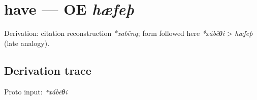 \documentclass[
  british,
  a4paper,
  openany]{book}
\providecommand{\texorpdfstring}[2]{#1}
\begin{document}
\section{\texorpdfstring{have --- OE
\emph{hæfeþ}}{have --- OE hæfeþ}}\label{have-oe-huxe6feuxfe}


Derivation: citation reconstruction \emph{*xabēną}; form followed here
\emph{*xábēθi} \textgreater{} \emph{hæfeþ} (late analogy).

\subsection{Derivation trace}\label{derivation-trace-115}

Proto input: \emph{*xábēθi}

\begingroup
\setlength{\fboxsep}{6pt}
\end{document}
